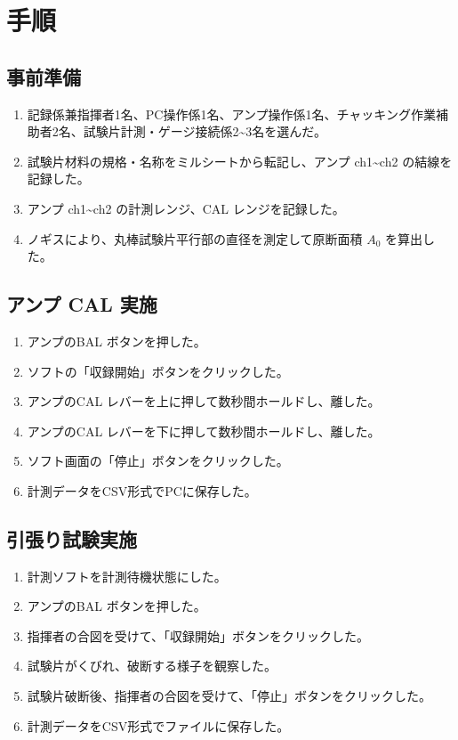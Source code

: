 \documentclass[11pt, a4paper, dvipdfmx]{jsreport}
\begin{document}
\section{手順}
\subsection{事前準備}
\begin{enumerate}
    \item 記録係兼指揮者1名、PC操作係1名、アンプ操作係1名、チャッキング作業補助者2名、試験片計測・ゲージ接続係2\textasciitilde3名を選んだ。
    \item 試験片材料の規格・名称をミルシートから転記し、アンプ ch1\textasciitilde ch2 の結線を記録した。
    \item アンプ ch1\textasciitilde ch2 の計測レンジ、CAL レンジを記録した。
    \item ノギスにより、丸棒試験片平行部の直径を測定して原断面積 $A_0$ を算出した。
\end{enumerate}

\subsection{アンプ CAL 実施}
\begin{enumerate}
    \item アンプのBAL ボタンを押した。
    \item ソフトの「収録開始」ボタンをクリックした。
    \item アンプのCAL レバーを上に押して数秒間ホールドし、離した。
    \item アンプのCAL レバーを下に押して数秒間ホールドし、離した。
    \item ソフト画面の「停止」ボタンをクリックした。
    \item 計測データをCSV形式でPCに保存した。
\end{enumerate}

\subsection{引張り試験実施}
\begin{enumerate}
    \item 計測ソフトを計測待機状態にした。
    \item アンプのBAL ボタンを押した。
    \item 指揮者の合図を受けて、「収録開始」ボタンをクリックした。
    \item 試験片がくびれ、破断する様子を観察した。
    \item 試験片破断後、指揮者の合図を受けて、「停止」ボタンをクリックした。
    \item 計測データをCSV形式でファイルに保存した。
\end{enumerate}
\end{document}
